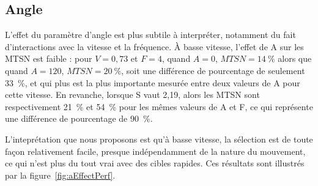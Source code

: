 	\subsection{Angle}
	L'effet du paramètre d'angle est plus subtile à interpréter, notamment du fait d'interactions avec la vitesse et la fréquence. À basse vitesse, l'effet de A sur les MTSN est faible : pour $V = 0,73$ et $F = 4$, quand $A= 0$, $MTSN = 14~\%{}$ alors que quand $A = 120$, $MTSN = 20~\%{}$, soit une différence de pourcentage de seulement 33~\%{}, et qui plus est la plus importante mesurée entre deux valeurs de A pour cette vitesse. En revanche, lorsque S vaut 2,19, alors les MTSN sont respectivement 21~\%{} et 54~\%{} pour les mêmes valeurs de A et F, ce qui représente une différence de pourcentage de 90~\%{}.
	
	L'inteprétation que nous proposons est qu'à basse vitesse, la sélection est de toute façon relativement facile, presque indépendamment de la nature du mouvement, ce qui n'est plus du tout vrai avec des cibles rapides. Ces résultats sont illustrés par la figure~\ref{fig:aEffectPerf}.

